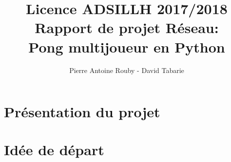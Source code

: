 \documentclass[12pt]{report}
\title{Licence ADSILLH 2017/2018\\Rapport de projet Réseau:\\Pong
  multijoueur en Python}
\author{Pierre Antoine Rouby - David Tabarie\newline}
\date{}
\begin{document}
\maketitle

\begin{abstract}
\end{abstract}
\tableofcontents

\part{Présentation du projet}

\part{Idée de départ}
\end{document}
